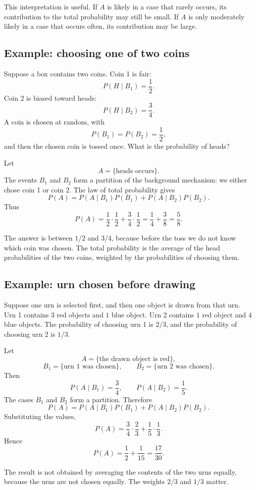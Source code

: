 This interpretation is useful. If \(A\) is likely in a case that rarely occurs,
its contribution to the total probability may still be small. If \(A\) is only
moderately likely in a case that occurs often, its contribution may be large.

\subsection*{Example: choosing one of two coins}

Suppose a box contains two coins. Coin 1 is fair:
\[
P(H\mid B_1)=\frac12.
\]
Coin 2 is biased toward heads:
\[
P(H\mid B_2)=\frac34.
\]
A coin is chosen at random, with
\[
P(B_1)=P(B_2)=\frac12,
\]
and then the chosen coin is tossed once. What is the probability of heads?

Let
\[
A=\{\text{heads occurs}\}.
\]
The events \(B_1\) and \(B_2\) form a partition of the background mechanism:
we either chose coin 1 or coin 2. The law of total probability gives
\[
P(A)=P(A\mid B_1)P(B_1)+P(A\mid B_2)P(B_2).
\]
Thus
\[
P(A)=\frac12\cdot\frac12+\frac34\cdot\frac12
=\frac14+\frac38=\frac58.
\]

The answer is between \(1/2\) and \(3/4\), because before the toss we do not know
which coin was chosen. The total probability is the average of the head
probabilities of the two coins, weighted by the probabilities of choosing them.

\subsection*{Example: urn chosen before drawing}

Suppose one urn is selected first, and then one object is drawn from that urn.
Urn 1 contains \(3\) red objects and \(1\) blue object. Urn 2 contains \(1\) red
object and \(4\) blue objects. The probability of choosing urn 1 is \(2/3\), and
the probability of choosing urn 2 is \(1/3\).

Let
\[
A=\{\text{the drawn object is red}\},
\]
\[
B_1=\{\text{urn 1 was chosen}\},\qquad
B_2=\{\text{urn 2 was chosen}\}.
\]
Then
\[
P(A\mid B_1)=\frac34,\qquad P(A\mid B_2)=\frac15.
\]
The cases \(B_1\) and \(B_2\) form a partition. Therefore
\[
P(A)=P(A\mid B_1)P(B_1)+P(A\mid B_2)P(B_2).
\]
Substituting the values,
\[
P(A)=\frac34\cdot\frac23+\frac15\cdot\frac13.
\]
Hence
\[
P(A)=\frac12+\frac1{15}=\frac{17}{30}.
\]

The result is not obtained by averaging the contents of the two urns equally,
because the urns are not chosen equally. The weights \(2/3\) and \(1/3\) matter.

